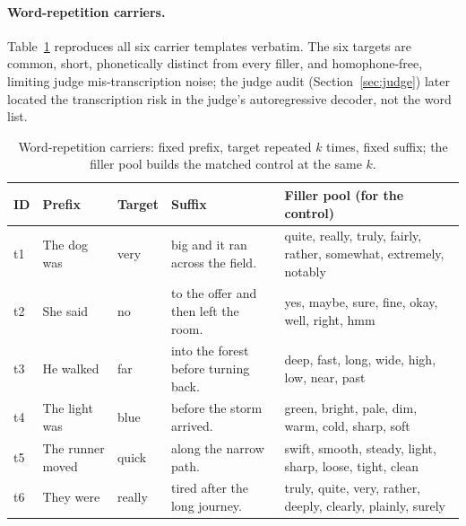 \paragraph{Word-repetition carriers.} Table~\ref{tab:templates} reproduces
all six carrier templates verbatim. The six targets are common, short,
phonetically distinct from every filler, and homophone-free, limiting
judge mis-transcription noise; the judge audit (Section~\ref{sec:judge})
later located the transcription risk in the judge's autoregressive
decoder, not the word list.
\begin{table}[tp]
\centering
\caption{Word-repetition carriers: fixed prefix, target repeated $k$ times,
fixed suffix; the filler pool builds the matched control at the same $k$.}
\label{tab:templates}
\small
\begin{tabular}{@{}lp{3.2cm}p{1.4cm}p{4.4cm}p{6.6cm}@{}}
\toprule
ID & Prefix & Target & Suffix & Filler pool (for the control) \\
\midrule
t1 & The dog was & very & big and it ran across the field. & quite, really, truly, fairly, rather, somewhat, extremely, notably \\
t2 & She said & no & to the offer and then left the room. & yes, maybe, sure, fine, okay, well, right, hmm \\
t3 & He walked & far & into the forest before turning back. & deep, fast, long, wide, high, low, near, past \\
t4 & The light was & blue & before the storm arrived. & green, bright, pale, dim, warm, cold, sharp, soft \\
t5 & The runner moved & quick & along the narrow path. & swift, smooth, steady, light, sharp, loose, tight, clean \\
t6 & They were & really & tired after the long journey. & truly, quite, very, rather, deeply, clearly, plainly, surely \\
\bottomrule
\end{tabular}
\end{table}

